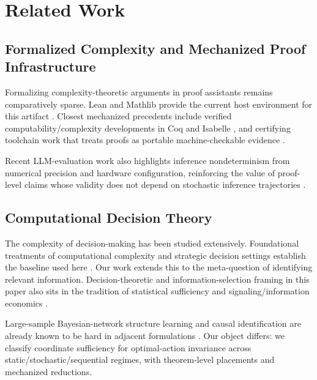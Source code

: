 \section{Related Work}\label{sec:related}

\subsection{Formalized Complexity and Mechanized Proof Infrastructure}

Formalizing complexity-theoretic arguments in proof assistants remains comparatively sparse. Lean and Mathlib provide the current host environment for this artifact \cite{Lean2015,demoura2021lean4,mathlib2020}. Closest mechanized precedents include verified computability/complexity developments in Coq and Isabelle \cite{forster2019verified, kunze2019formal, nipkow2002isabelle, nipkow2014concrete, haslbeck2016verified}, and certifying toolchain work that treats proofs as portable machine-checkable evidence \cite{leroy2009compcert, necula1997proof}.

Recent LLM-evaluation work also highlights inference nondeterminism from numerical precision and hardware configuration, reinforcing the value of proof-level claims whose validity does not depend on stochastic inference trajectories \cite{yuan2025fp32}.

\subsection{Computational Decision Theory}

The complexity of decision-making has been studied extensively. Foundational treatments of computational complexity and strategic decision settings establish the baseline used here \cite{papadimitriou1994complexity,arora2009computational}. Our work extends this to the meta-question of identifying relevant information. Decision-theoretic and information-selection framing in this paper also sits in the tradition of statistical sufficiency and signaling/information economics \cite{fisher1922mathematical, spence1973job, myerson1979incentive, milgrom1986price, kamenica2011bayesian}.

Large-sample Bayesian-network structure learning and causal identification are already known to be hard in adjacent formulations \cite{chickering2004large,shpitser2006identification,koller2009probabilistic}. Our object differs: we classify coordinate sufficiency for optimal-action invariance across static/stochastic/sequential regimes, with theorem-level placements and mechanized reductions.

